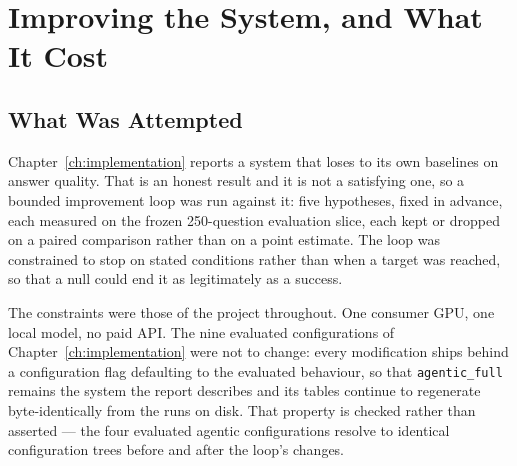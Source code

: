 %
%
%
%

\chapter{Improving the System, and What It Cost}
\label{ch:improvement}

\section{What Was Attempted}
\label{sec:improvement-attempted}

Chapter~\ref{ch:implementation} reports a system that loses to its own
baselines on answer quality. That is an honest result and it is not a
satisfying one, so a bounded improvement loop was run against it: five
hypotheses, fixed in advance, each measured on the frozen 250-question
evaluation slice, each kept or dropped on a paired comparison rather than on a
point estimate. The loop was constrained to stop on stated conditions rather
than when a target was reached, so that a null could end it as legitimately as
a success.

The constraints were those of the project throughout. One consumer GPU, one
local model, no paid API. The nine evaluated configurations of
Chapter~\ref{ch:implementation} were not to change: every modification ships
behind a configuration flag defaulting to the evaluated behaviour, so that
\texttt{agentic\_full} remains the system the report describes and its tables
continue to regenerate byte-identically from the runs on disk. That property
is checked rather than asserted --- the four evaluated agentic configurations
resolve to identical configuration trees before and after the loop's changes.

